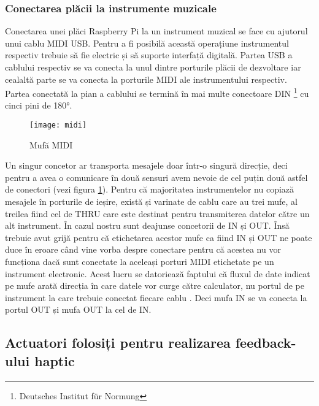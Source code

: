 \documentclass[../IoMusT.tex]{subfiles}
\begin{document}
\subsubsection{Conectarea plăcii la instrumente muzicale}
Conectarea unei plăci Raspberry Pi la un instrument muzical se face cu ajutorul unui cablu MIDI USB. Pentru a fi posibilă această operațiune instrumentul respectiv trebuie să fie electric și să suporte interfață digitală. Partea USB a cablului respectiv se va conecta la unul dintre porturile plăcii de dezvoltare iar cealaltă parte se va conecta la porturile MIDI ale instrumentului respectiv. Partea conectată la pian a cablului se termină în mai multe conectoare DIN \footnote{Deutsches Institut für Normung} cu cinci pini de 180\si{\degree}.
\begin{figure}[h]
\centering
\texttt{[image: midi]}
\caption{Mufă MIDI}
\label{fig:midi}
\end{figure}  
 Un singur concetor ar transporta  mesajele doar într-o singură direcție, deci pentru a avea o comunicare în două sensuri avem nevoie de cel puțin două astfel de conectori (vezi figura \ref{fig:midi}). Pentru că majoritatea instrumentelor nu copiază mesajele în porturile de ieșire, există și varinate de cablu care au trei mufe, al treilea fiind cel de THRU care este destinat pentru transmiterea datelor către un alt instrument. În cazul nostru sunt deajunse concetorii de IN și OUT. Însă trebuie avut grijă pentru că etichetarea acestor mufe ca fiind IN și OUT ne poate duce în eroare când vine vorba despre conectare pentru că acestea nu vor funcționa dacă sunt conectate la aceleași porturi MIDI etichetate pe un instrument electronic. Acest lucru se datoriează faptului că fluxul de date indicat pe mufe arată direcția  în care datele vor curge către calculator, nu portul  de pe instrument la care  trebuie conectat fiecare cablu \cite{Midi}. Deci mufa IN se va conecta la portul OUT și mufa OUT la cel de IN.

\subsection{Actuatori folosiți pentru realizarea feedback-ului haptic}
\end{document}
